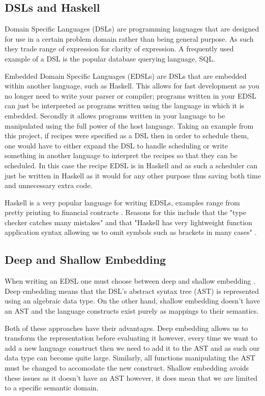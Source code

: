 \documentclass[11pt]{article}
\begin{document}
\subsection{DSLs and Haskell}
Domain Specific Languages (DSLs) are programming languages that
are designed for use in a certain problem domain rather than
being general purpose. As such they trade range of expression
for clarity of expression. A frequently used example of a DSL
is the popular database querying language, SQL.

\medbreak

Embedded Domain Specific Languages (EDSLs) are DSLs that are embedded
within another language, such as Haskell. This allows for
fast development as you no longer need to write your parser
or compiler; programs written in your EDSL can just be interpreted
as programs written using the language in which it is embedded.
Secondly it allows programs written in your language to be
manipulated using the full power of the host language. Taking
an example from this project, if recipes were specified as a DSL
then in order to schedule them, one would have to either expand
the DSL to handle scheduling or write something in another language
to interpret the recipes so that they can be scheduled. In this
case the recipe EDSL is in Haskell and as such a scheduler can
just be written in Haskell as it would for any other purpose thus
saving both time and unnecessary extra code.

\medbreak

Haskell is a very popular language for writing EDSLs, examples
range from pretty printing \cite{pretty} to financial contracts \cite{contracts}.
Reasons for this include that the "type checker catches many mistakes"
and that "Haskell has very lightweight function application syntax
allowing us to omit symbols such as brackets in many cases" \cite{snoyman}.

\subsection{Deep and Shallow Embedding}
When writing an EDSL one must choose between deep and shallow embedding \cite{embedding}.
Deep embedding means that the DSL's abstract syntax tree (AST) is
represented using an algebraic data type. On the other hand, shallow
embedding doesn't have an AST and the language constructs exist purely
as mappings to their semantics.

\medbreak

Both of these approaches have their advantages. Deep embedding
allows us to transform the representation before evaluating
it however, every time we want to add a new language construct
then we need to add it to the AST and as such our data type
can become quite large. Similarly, all functions manipulating
the AST must be changed to accomodate the new construct. Shallow
embedding avoids these issues as it doesn't have an AST however,
it does mean that we are limited to a specific semantic domain.
\end{document}
